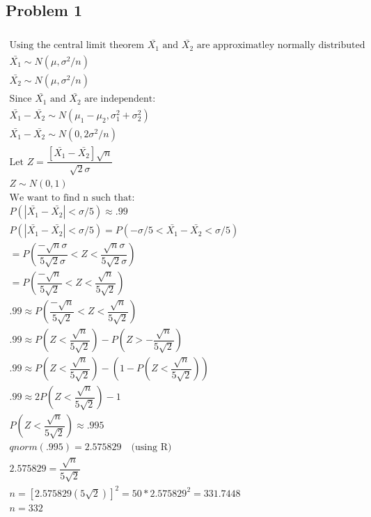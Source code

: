 \documentclass{article}
\begin{document}
\begin{flushleft}

	\section*{Problem 1}
	
\begin{multline*}\\
\text{Using the central limit theorem } \bar{X_1} \text{ and } \bar{X_2} \text{ are approximatley normally distributed }\\
\bar{X_1} \sim N(\mu,\sigma^2/n)\\
\bar{X_2} \sim N(\mu,\sigma^2/n)\\
\text{Since } \bar{X_1} \text{ and } \bar{X_2} \text{ are independent:}\\
\bar{X_1}-\bar{X_2}\sim N(\mu_1-\mu_2,\sigma^2_1+\sigma^2_2)\\
\bar{X_1}-\bar{X_2}\sim N(0,2\sigma^2/n)\\
\text{Let } Z=\dfrac{[\bar{X_1}-\bar{X_2}]\sqrt{n}}{\sqrt{2}\sigma}\\
Z \sim N(0,1)\\
\text{We want to find n such that:}\\
P(|\bar{X_1}-\bar{X_2}|<\sigma/5)\approx .99\\ 
P(|\bar{X_1}-\bar{X_2}|<\sigma/5)=P(-\sigma/5<\bar{X_1}-\bar{X_2}<\sigma/5)\\
=P(\dfrac{-\sqrt{n}\sigma}{5\sqrt{2}\sigma}<Z<\dfrac{\sqrt{n}\sigma}{5\sqrt{2}\sigma})\\
=P(\dfrac{-\sqrt{n}}{5\sqrt{2}}<Z<\dfrac{\sqrt{n}}{5\sqrt{2}})\\
.99\approx P(\dfrac{-\sqrt{n}}{5\sqrt{2}}<Z<\dfrac{\sqrt{n}}{5\sqrt{2}})\\
.99\approx P(Z<\dfrac{\sqrt{n}}{5\sqrt{2}})-P(Z>-\dfrac{\sqrt{n}}{5\sqrt{2}})\\
.99\approx P(Z<\dfrac{\sqrt{n}}{5\sqrt{2}})-(1-P(Z<\dfrac{\sqrt{n}}{5\sqrt{2}}))\\
.99\approx 2P(Z<\dfrac{\sqrt{n}}{5\sqrt{2}})-1\\
P(Z<\dfrac{\sqrt{n}}{5\sqrt{2}})\approx .995\\
qnorm(.995)=2.575829 \quad \text{(using R)}\\
2.575829=\dfrac{\sqrt{n}}{5\sqrt{2}}\\
n=[2.575829(5\sqrt{2})]^2=50*2.575829^2=331.7448\\
n=332\\
\end{multline*}


\end{flushleft}
\end{document}
